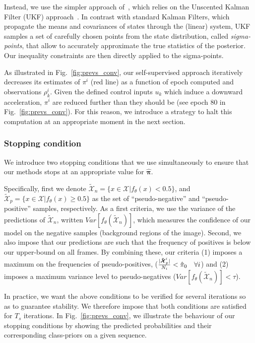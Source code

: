 Instead, we use the simpler approach of~\cite{kandepu08}, which relies on the Unscented Kalman Filter (UKF) approach~\cite{wan00}. In contrast with standard Kalman Filters, which propagate the means and covariances of states through the (linear) system, UKF samples a set of carefully chosen points from the state distribution, called {\it sigma-points}, that allow to accurately approximate the true statistics of the posterior. Our inequality constraints are then directly applied to the sigma-points.

As illustrated in Fig.~\ref{fig:prevs_conv}, our self-supervised approach iteratively decreases its estimates of $\pi^i$ (red line) as a function of epoch computed and observations $\rho_{k}^{i}$. Given the defined control inputs $u_k$ which induce a downward acceleration, $\pi^i$ are reduced further than they should be (see epoch 80 in Fig.~\ref{fig:prevs_conv}). For this reason, we introduce a strategy to halt this computation at an appropriate moment in the next section. 

\subsubsection{Stopping condition}
We introduce two stopping conditions that we use simultaneously to ensure that our methods stops at an appropriate value for $\bm\hat\pi$.

Specifically, first we denote $\bm{\tilde{\mathcal{X}}}_{n}=\{x \in \bm{\mathcal{X}} | f_{\theta}(x) < 0.5\}$, and $\bm{\tilde{\mathcal{X}}}_{p}=\{x \in \bm{\mathcal{X}} | f_{\theta}(x) \geq 0.5\}$ as the set of ``pseudo-negative'' and ``pseudo-positive'' samples, respectively.
As a first criteria, we use the variance of the predictions of  $\bm{\tilde{\mathcal{X}}}_{n}$, written $Var[f_{\theta}(\bm{\mathcal{\tilde X}}_{n})]$, which measures the confidence of our model on the negative samples (\ie background regions of the image).
Second, we also impose that our predictions are such that the frequency of positives is below our upper-bound on all frames. By combining these, our criteria (1) imposes a maximum on the frequencies of pseudo-positives, (\ie $\frac{|\bm{\tilde \mathcal{X}}_{p}^{i}|}{N_{i}} < \hat \pi_{0} \quad \forall i$) and (2) imposes a maximum variance level to pseudo-negatives (\ie $Var[f_{\theta}(\bm{\mathcal{\tilde X}}_{n})] < \tau$).

In practice, we want the above conditions to be verified for several iterations so as to guarantee stability. We therefore impose that both conditions are satisfied for $T_{s}$ iterations. In Fig.~\ref{fig:prevs_conv}, we illustrate the behaviour of our stopping conditions by showing the predicted probabilities and their corresponding class-priors on a given sequence.


